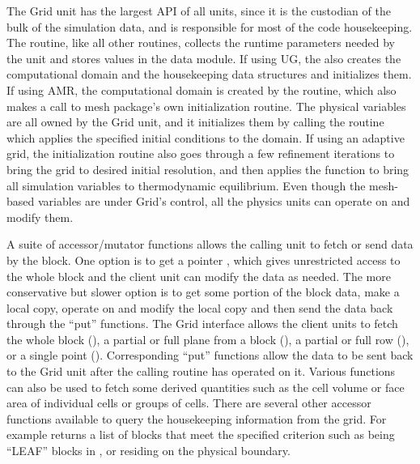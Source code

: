 The \unit{Grid} unit has the largest API of all units, since it is the
custodian of the bulk of the simulation data, and is responsible for most
of the code housekeeping. The  routine, like all
other  routines, collects the runtime parameters needed by
the unit and stores values in the data module. If using UG, the
 also creates the computational domain and the
housekeeping data structures and
initializes them. If using AMR, the computational domain is created
by the  routine, which also makes a call to
mesh package's own initialization routine. The physical variables are all
owned by the \unit{Grid} unit, and it initializes them by
calling the 
routine which applies the specified initial conditions to the
domain. If using an adaptive grid, the initialization routine also goes
through a few refinement iterations to bring the grid to desired
initial resolution, and then applies the 
function to bring all simulation variables to thermodynamic equilibrium.
Even though the mesh-based variables are under \unit{Grid}'s control,
all the physics units can operate on and modify them.

A suite of  accessor/mutator functions allows the
calling unit to fetch or send data by the block. One option is to get a pointer
, which gives unrestricted access to the whole
block and the client unit can modify the data as needed. The more
conservative but slower option is to get some portion of the block
data, make a local copy, operate on and modify the local copy and then
send the data back through the ``put'' functions. The \unit{Grid} interface
allows the client units to fetch the whole block
(), a partial or full plane from a block
(), a partial or full row
(), or a single point
(). Corresponding ``put'' functions allow
the data to be sent back to the \unit{Grid} unit after the calling
routine has operated on it. Various  functions can also
be used to fetch some derived quantities such as the cell volume or
face area of individual cells or groups of cells. There are several
other accessor functions available to query the housekeeping
information from the grid. For example 
returns a list of blocks that meet the specified criterion such as
being ``LEAF'' blocks in \Paramesh, or residing on the physical
boundary. 



